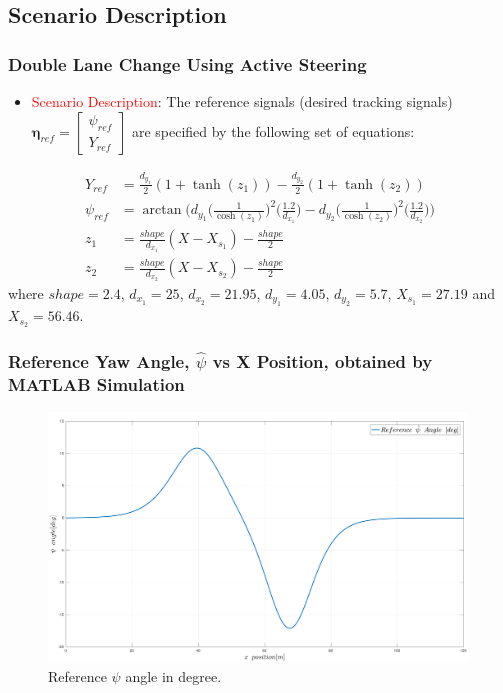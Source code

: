 \documentclass{beamer}
\begin{document}
\subsection{Scenario Description}
\begin{frame}
	\frametitle{Double Lane Change Using Active Steering}
	\begin{itemize}
		\item \textcolor{red}{Scenario Description}: The reference signals (desired tracking signals) $\bm{\eta}_{ref} = \begin{bmatrix} \psi_{ref}\\ Y_{ref} \end{bmatrix}$ are specified by the following set of equations: 
	\end{itemize}
	\begin{subequations} 
		\label{eqn:reference_path_angle_equations}
		\begin{align} 
		{Y}_{ref}&= \frac{d_{y_1}}{2}(1 + \tanh(z_1))-\frac{d_{y_2}}{2}(1 + \tanh(z_2)) \\
		{\psi}_{ref} & = \arctan\Bigg(d_{y_1}\Big(\frac{1}{\cosh(z_1)}\Big)^2\Big(\frac{1.2}{d_{x_1}}\Big) - d_{y_2}\Big(\frac{1}{\cosh(z_2)}\Big)^2\Big(\frac{1.2}{d_{x_2}}\Big) \Bigg)  \\
		z_1 &= \frac{shape}{d_{x_1}}(X-X_{s_1})-\frac{shape}{2} \\
		z_2 &= \frac{shape}{d_{x_2}}(X-X_{s_2})-\frac{shape}{2}
		\end{align} 
	\end{subequations}
	where $shape=2.4$, $d_{x_1} = 25$, $d_{x_2} = 21.95$, $d_{y_1} = 4.05$, $d_{y_2} = 5.7$, $X_{s_1} = 27.19$ and
	$X_{s_2} = 56.46$.
\end{frame}

\begin{frame}
	\frametitle{Reference Yaw Angle, $\hat{\psi}$ vs X Position, obtained by MATLAB Simulation}
	\begin{figure}
		\centering
		\includegraphics[width=0.99\textwidth,keepaspectratio]{images/Reference-Yaw-Angle.pdf}
		\caption{Reference $\psi$ angle in degree.}
		\label{fig_05:reference_yaw_angle}
	\end{figure}
\end{frame}
\end{document}
